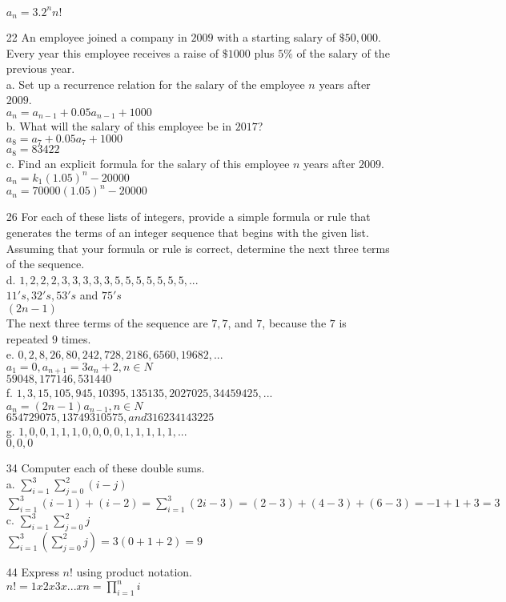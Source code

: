 \documentclass[a4paper]{article}
\newcommand\tab[1][0.5cm]{\hspace*{#1}}
\begin{document}
\begin{itemize}
      \tab $a_n = 3.2^{n}n!$
    \item[22] An employee joined a company in $2009$ with a starting salary of $\$50,000$. Every year this employee receives a raise of $\$1000$ plus $5\%$ of the salary of the previous year. \\
      a. Set up a recurrence relation for the salary of the employee $n$ years after $2009$. \\
      \tab $a_n = a_{n - 1} + 0.05a_{n - 1} + 1000$ \\
      b. What will the salary of this employee be in $2017$? \\
      \tab $a_8 = a_7 + 0.05a_7 + 1000$ \\
      \tab $a_8 = 83422$ \\
      c. Find an explicit formula for the salary of this employee $n$ years after $2009$. \\
      \tab $a_n = k_1(1.05)^n - 20000$ \\
      \tab $a_n = 70000(1.05)^n - 20000$ 
    \item[26] For each of these lists of integers, provide a simple formula or rule that generates the terms of an integer sequence that begins with the given list. Assuming that your formula or rule is correct, determine the next three terms of the sequence. \\
      d. $1, 2, 2, 2, 3, 3, 3, 3, 3, 5, 5, 5, 5, 5, 5, 5, ...$ \\
      \tab $1 1's, 3 2's, 5 3's$ and $7 5's$ \\
      \tab $(2n - 1)$ \\
      \tab The next three terms of the sequence are $7, 7$, and $7$, because the $7$ is repeated $9$ times. \\
      e. $0, 2, 8, 26, 80, 242, 728, 2186, 6560, 19682, ...$ \\
      \tab $a_1 = 0, a_{n + 1} = 3a_n + 2, n \in N$ \\
      \tab $59048, 177146, 531440$ \\
      f. $1, 3, 15, 105, 945, 10395, 135135, 2027025, 34459425, ...$ \\
      \tab $a_n = (2n - 1)a_{n - 1}, n\in N$ \\
      \tab $654729075, 13749310575, and 316234143225$ \\
      g. $1, 0, 0, 1, 1, 1, 0, 0, 0, 0, 1, 1, 1, 1, 1, ...$ \\
      \tab $0, 0, 0$
    \item[34] Computer each of these double sums. \\
      a. $\sum_{i = 1}^3 \sum_{j = 0}^2 (i - j)$ \\
      \tab $\sum_{i = 1}^3 (i - 1) + (i - 2) = \sum_{i = 1}^{3} (2i - 3) = (2 -3) + (4 - 3) + (6 - 3) = -1 + 1 + 3 = 3$ \\
      c. $\sum_{i = 1}^3 \sum_{j = 0}^2 j$ \\
      \tab $\sum_{i = 1}^{3} (\sum_{j = 0}^{2} j) = 3(0 + 1 + 2) = 9$
    \item[44] Express $n!$ using product notation. \\
    \tab $n! = 1 x 2 x 3 x ... x n = \prod_{i = 1}^{n} i$ 
  \end{itemize}

  
  
\end{document}
